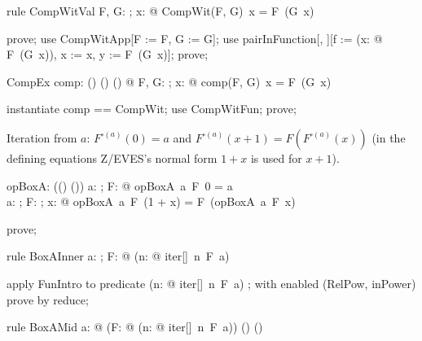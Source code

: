 \documentclass{article}
\begin{document}
\begin{theorem}{rule CompWitVal}
  \forall F, G: \nat \fun \nat; x: \nat @ CompWit(F, G)~x = F~(G~x)
\end{theorem}

\begin{zproof}
prove;
use CompWitApp[F := F, G := G];
use pairInFunction[\nat, \nat][f := (\lambda x: \nat @ F~(G~x)), x := x, y := F~(G~x)];
prove;
\end{zproof}

\begin{theorem}{CompEx}
  \exists comp: (\nat \fun \nat) \cross (\nat \fun \nat) \fun (\nat \fun \nat) @ \forall F, G: \nat \fun \nat; x: \nat @ comp(F, G)~x = F~(G~x)
\end{theorem}

\begin{zproof}
instantiate comp == CompWit;
use CompWitFun;
prove;
\end{zproof}

Iteration from $a$: $F^{\square(a)}(0) = a$ and $F^{\square(a)}(x+1) = F(F^{\square(a)}(x))$
(in the defining equations Z/EVES's normal form $1 + x$ is used for $x + 1$).

\begin{axdef}
  opBoxA: \nat \fun ((\nat \fun \nat) \fun (\nat \fun \nat))
\where
   \forall a: \nat; F: \nat \fun \nat @ opBoxA~a~F~0 = a \\
   \forall a: \nat; F: \nat \fun \nat; x: \nat @ opBoxA~a~F~(1 + x) = F~(opBoxA~a~F~x)
\end{axdef}

\begin{zproof}
prove;
\end{zproof}

\begin{theorem}{rule BoxAInner}
  \forall a: \nat; F: \nat \fun \nat @ (\lambda n: \nat @ iter[\nat]~n~F~a) \in \nat \fun \nat
\end{theorem}

\begin{zproof}
apply FunIntro to predicate (\lambda n: \nat @ iter[\nat]~n~F~a) \in \nat \fun \nat;
with enabled (RelPow, inPower) prove by reduce;
\end{zproof}

\begin{theorem}{rule BoxAMid}
  \forall a: \nat @ (\lambda F: \nat \fun \nat @ (\lambda n: \nat @ iter[\nat]~n~F~a)) \in (\nat \fun \nat) \fun (\nat \fun \nat)
\end{theorem}
\end{document}
